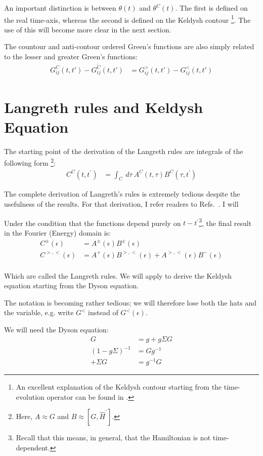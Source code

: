 An important distinction is between $\theta (t)$ and $\theta^C(t)$. The first is defined on the real time-axis, whereas the second is defined on the Keldysh contour \footnote{An excellent explanation of the Keldysh contour starting from the time-evolution operator can be found in \citet{diventra}.}. The use of this will become more clear in the next section. 

The countour and anti-contour ordered Green's functions are also simply related to the lesser and greater Green's functions:
\begin{align*}
G^C_{ij}(t,t') - G^{\tilde{C}}_{ij}(t,t') &= G^>_{ij}(t,t') - G^<_{ij}(t,t')
\end{align*}

\section{Langreth rules and Keldysh Equation}
The starting point of the derivation of the Langreth rules are integrals of the following form \footnote{Here, $A \approx G$ and $B \approx [G, \widehat{H}^\prime]$.}:
\begin{align*}
C^C(t,t^\prime) &= \int_C\:d\tau\:A^C(t,\tau) B^C (\tau, t^\prime)
\end{align*}

The complete derivation of Langreth's rules is extremely tedious despite the usefulness of the results. For that derivation, I refer readers to Refs.~\cite{mattuck,haugjauho}. I will 
 
Under the condition that the functions depend purely on $t-t^\prime$\footnote{Recall that this means, in general, that the Hamiltonian is not time-dependent.}, the final result in the Fourier (Energy) domain is:
\begin{align*}
C^\pm (\epsilon) &= 
A^\pm (\epsilon) 
B^\pm (\epsilon) \\
C^{>,<} (\epsilon) &= 
A^+ (\epsilon) 
B^{>,<} (\epsilon) + 
A^{>,<} (\epsilon) 
B^- (\epsilon) \\
\end{align*}

Which are called the Langreth rules. We will apply to derive the Keldysh equation starting from the Dyson equation.
 
The notation is becoming rather tedious; we will therefore lose both the hats and the variable, e.g. write $G^<$ instead of $G^<(\epsilon)$.

We will need the Dyson equation:
\begin{align*}
G &= g + g\Sigma G \\
(1 - g\Sigma)^{-1} &=G  g^{-1} \\
+ \Sigma G &= g^{-1} G
\end{align*}

